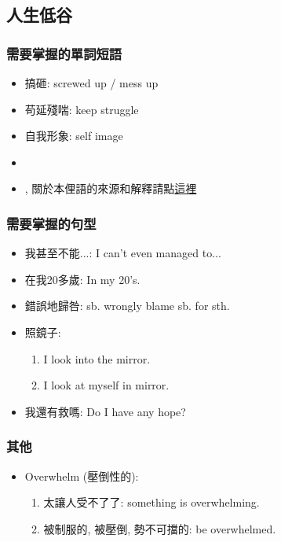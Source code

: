 \subsection{人生低谷}
\subsubsection*{需要掌握的單詞短語}
\begin{itemize}
  \itemsep0em
  \item 搞砸: screwed up / mess up
  \item 苟延殘喘: keep struggle
  \item 自我形象: self image
  \item {}
  \item {}, 關於本俚語的來源和解釋請點\href{http://www.ept-xp.com/?ID=2204020903}{這裡}
\end{itemize}

\subsubsection*{需要掌握的句型}
\begin{itemize}
  \itemsep0em
  \item 我甚至不能...: I can't even managed to...
  \item 在我20多歲: In my 20's.
  \item 錯誤地歸咎: sb. wrongly blame sb. for sth.
  \item 照鏡子:
  \begin{enumerate}
    \itemsep0em
    \item I look into the mirror.
    \item I look at myself in mirror.
  \end{enumerate}
  \item 我還有救嗎: Do I have any hope?
\end{itemize}

\subsubsection*{其他}
\begin{itemize}
  \itemsep0em
  \item Overwhelm (壓倒性的):
  \begin{enumerate}
    \itemsep0em
    \item 太讓人受不了了: something is overwhelming.
    \item 被制服的, 被壓倒, 勢不可擋的: be overwhelmed.
  \end{enumerate}
\end{itemize}

